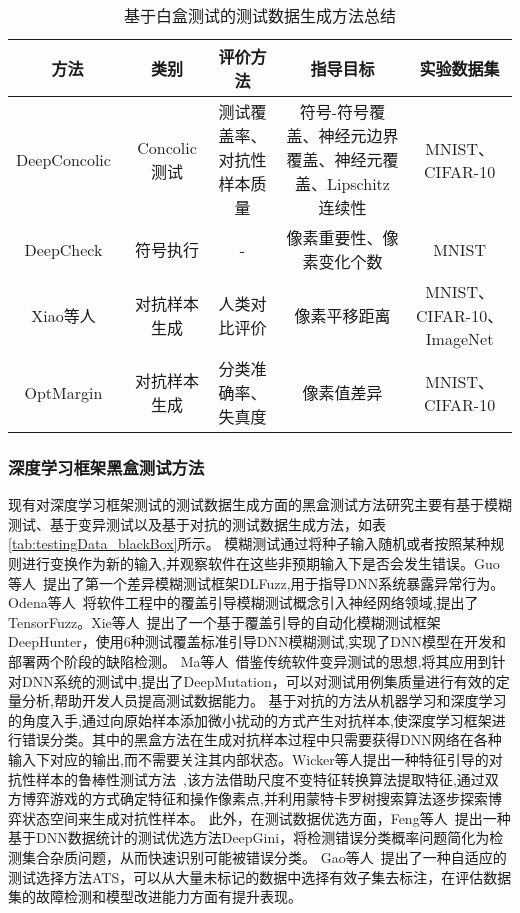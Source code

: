 \begin{table}[t]
	\small
	\centering
	\caption{基于白盒测试的测试数据生成方法总结}
	\label{tab:testingData_whiteBox}
	\begin{tabular}{c|c|c|c|c}
		\toprule
		方法 & 类别 & 评价方法 & 指导目标 & 实验数据集 \\
		\midrule
		DeepConcolic~\citess{Sun2018Concolic} & Concolic测试 & 测试覆盖率、对抗性样本质量 & 符号-符号覆盖、神经元边界覆盖、神经元覆盖、Lipschitz 连续性 & MNIST、CIFAR-10 \\
		\midrule
		DeepCheck~\citess{Gopinath2018Symbolic} & 符号执行 & - & 像素重要性、像素变化个数 & MNIST \\
		\midrule
		Xiao等人~\citess{Xiao2018Spatially} & 对抗样本生成 & 人类对比评价 & 像素平移距离 & MNIST、CIFAR-10、ImageNet \\
		\midrule
		OptMargin~\citess{He2018Decision} & 对抗样本生成 & 分类准确率、失真度 & 像素值差异 & MNIST、CIFAR-10 \\
		
	    
		\bottomrule
	\end{tabular}
\end{table}



\subsubsection{深度学习框架黑盒测试方法}

现有对深度学习框架测试的测试数据生成方面的黑盒测试方法研究主要有基于模糊测试、基于变异测试以及基于对抗的测试数据生成方法，如表\cref{tab:testingData_blackBox}所示。
模糊测试通过将种子输入随机或者按照某种规则进行变换作为新的输入,并观察软件在这些非预期输入下是否会发生错误。Guo等人~提出了第一个差异模糊测试框架DLFuzz,用于指导DNN系统暴露异常行为。Odena等人~将软件工程中的覆盖引导模糊测试概念引入神经网络领域,提出了TensorFuzz。Xie等人~提出了一个基于覆盖引导的自动化模糊测试框架DeepHunter，使用6种测试覆盖标准引导DNN模糊测试,实现了DNN模型在开发和部署两个阶段的缺陷检测。
Ma等人~借鉴传统软件变异测试的思想,将其应用到针对DNN系统的测试中,提出了DeepMutation，可以对测试用例集质量进行有效的定量分析,帮助开发人员提高测试数据能力。
基于对抗的方法从机器学习和深度学习的角度入手,通过向原始样本添加微小扰动的方式产生对抗样本,使深度学习框架进行错误分类。其中的黑盒方法在生成对抗样本过程中只需要获得DNN网络在各种输入下对应的输出,而不需要关注其内部状态。Wicker等人提出一种特征引导的对抗性样本的鲁棒性测试方法~,该方法借助尺度不变特征转换算法提取特征,通过双方博弈游戏的方式确定特征和操作像素点,并利用蒙特卡罗树搜索算法逐步探索博弈状态空间来生成对抗性样本。
此外，在测试数据优选方面，Feng等人~提出一种基于DNN数据统计的测试优选方法DeepGini，将检测错误分类概率问题简化为检测集合杂质问题，从而快速识别可能被错误分类。
Gao等人~提出了一种自适应的测试选择方法ATS，可以从大量未标记的数据中选择有效子集去标注，在评估数据集的故障检测和模型改进能力方面有提升表现。


